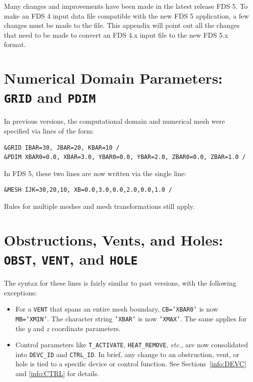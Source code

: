 \documentclass[11pt]{book}
\newcommand{\ct}{\tt\small}
\begin{document}
Many changes and improvements have been made in the latest release FDS 5.
To make an FDS 4 input data file compatible with the new FDS 5 application,
a few changes must be made to the file.
This appendix will point out all the changes that need to be made to convert
an FDS 4.x input file to the new FDS 5.x format.

\section{Numerical Domain Parameters: \texorpdfstring{{\tt GRID}}{GRID} and \texorpdfstring{{\tt PDIM}}{PDIM} }

In previous versions, the computational domain and numerical mesh were specified via lines of the form:

\footnotesize
\begin{verbatim}
&GRID IBAR=30, JBAR=20, KBAR=10 /
&PDIM XBAR0=0.0, XBAR=3.0, YBAR0=0.0, YBAR=2.0, ZBAR0=0.0, ZBAR=1.0 /
\end{verbatim} \normalsize

\noindent
In FDS 5, these two lines are now written via the single line:

\footnotesize
\begin{verbatim}
&MESH IJK=30,20,10, XB=0.0,3.0,0.0,2.0,0.0,1.0 /
\end{verbatim} \normalsize

\noindent
Rules for multiple meshes and mesh transformations still apply.

\section{Obstructions, Vents, and Holes: \texorpdfstring{{\tt OBST}}{OBST}, \texorpdfstring{{\tt VENT}}{VENT}, and \texorpdfstring{{\tt HOLE}}{HOLE}}

The syntax for these lines is fairly similar to past versions, with the following exceptions:
\begin{itemize}
\item For a {\ct VENT} that spans an entire mesh boundary, {\ct CB='XBAR0'} is now {\ct MB='XMIN'}. The character string
{\ct 'XBAR'} is now {\ct 'XMAX'}. The same applies for the $y$ and $z$ coordinate parameters.
\item Control parameters like {\ct T\_ACTIVATE}, {\ct HEAT\_REMOVE}, {\em etc.}, are now consolidated into {\ct DEVC\_ID} and
{\ct CTRL\_ID}. In brief,
any change to an obstruction, vent, or hole is tied to a specific device or control function. See Sections~\ref{info:DEVC} and
\ref{info:CTRL} for details.
\end{itemize}
\end{document}
